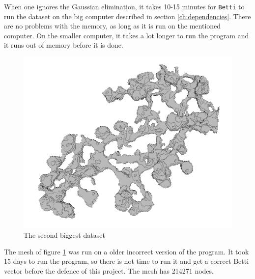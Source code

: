 \documentclass[11pt,a4paper,twoside]{report}
\begin{document}
When one ignores the Gaussian elimination, it takes 10-15 minutes for \texttt{Betti} to run the dataset on the big computer described in section \ref{ch:dependencies}. There are no problems with the memory, as long as it is run on the mentioned computer. On the smaller computer, it takes a lot longer to run the program and it runs out of memory before it is done.
\begin{figure}[H]
\center
\includegraphics[scale=0.5]{testmesh2d00.png}
\caption{The second biggest dataset}
\label{fig:mesh_2d}
\end{figure}
The mesh of figure \ref{fig:mesh_2d} was run on a older incorrect version of the program. It took 15 days to run the program, so there is not time to run it and get a correct Betti vector before the defence of this project. The mesh has 214271 nodes.
\end{document}
